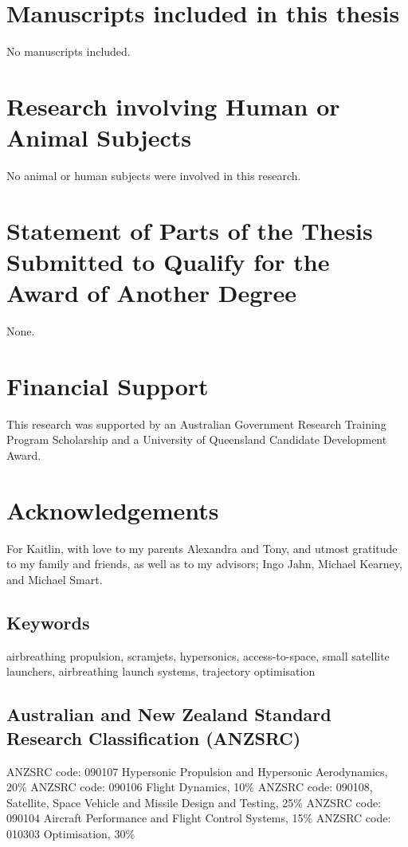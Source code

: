 \section*{Manuscripts included in this thesis}
No manuscripts included.

\section*{Research involving Human or Animal Subjects}
No animal or human subjects were involved in this research.

\section*{Statement of Parts of the Thesis Submitted to Qualify for the Award of Another Degree}

None.

\clearpage

\section*{Financial Support}
This research was supported by an Australian Government Research Training Program Scholarship and a University of Queensland Candidate Development Award.
\clearpage


\section*{Acknowledgements} 
  For Kaitlin, with love to my parents Alexandra and Tony, and utmost gratitude to my family and friends, as well as to my advisors; Ingo Jahn, Michael Kearney, and Michael Smart. 

      \vspace*{\fill}


\clearpage
\subsection*{Keywords}
  airbreathing propulsion, scramjets, hypersonics, access-to-space, small satellite launchers, airbreathing launch systems, trajectory optimisation

\subsection*{Australian and New Zealand Standard Research Classification (ANZSRC)}

  ANZSRC code: 090107 Hypersonic Propulsion and Hypersonic Aerodynamics, 20\% \newline
 ANZSRC code: 090106 Flight Dynamics, 10\% \newline
 ANZSRC code: 090108, Satellite, Space Vehicle and Missile Design and Testing, 25\% \newline
ANZSRC code: 090104 Aircraft Performance and Flight Control Systems, 15\% \newline
ANZSRC code: 010303 Optimisation, 30\% \newline

